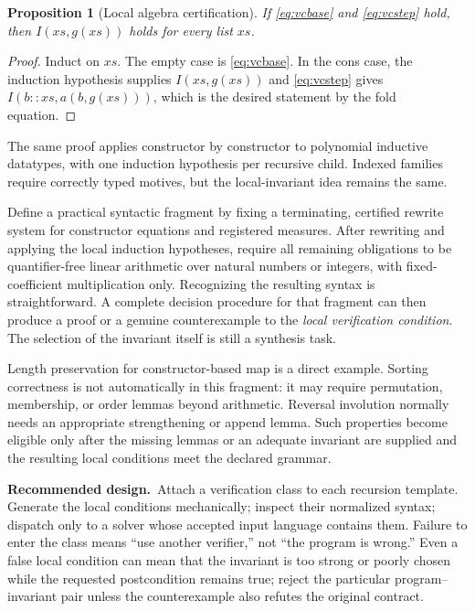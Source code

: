 \documentclass[11pt,a4paper]{article}
\newcommand{\proposal}{\noindent\textbf{Recommended design.}\ }
\newtheorem{proposition}{Proposition}[section]
\theoremstyle{remark}
\begin{document}
\begin{proposition}[Local algebra certification]\label{prop:algebra}
If \eqref{eq:vcbase} and \eqref{eq:vcstep} hold, then $I(xs,g(xs))$ holds for every list $xs$.
\end{proposition}
\begin{proof}
Induct on $xs$. The empty case is \eqref{eq:vcbase}. In the cons case, the induction hypothesis supplies $I(xs,g(xs))$ and \eqref{eq:vcstep} gives $I(b::xs,a(b,g(xs)))$, which is the desired statement by the fold equation.
\end{proof}

The same proof applies constructor by constructor to polynomial inductive datatypes, with one induction hypothesis per recursive child. Indexed families require correctly typed motives, but the local-invariant idea remains the same.

Define a practical syntactic fragment by fixing a terminating, certified rewrite system for constructor equations and registered measures. After rewriting and applying the local induction hypotheses, require all remaining obligations to be quantifier-free linear arithmetic over natural numbers or integers, with fixed-coefficient multiplication only. Recognizing the resulting syntax is straightforward. A complete decision procedure for that fragment can then produce a proof or a genuine counterexample to the \emph{local verification condition}. The selection of the invariant itself is still a synthesis task.

Length preservation for constructor-based map is a direct example. Sorting correctness is not automatically in this fragment: it may require permutation, membership, or order lemmas beyond arithmetic. Reversal involution normally needs an appropriate strengthening or append lemma. Such properties become eligible only after the missing lemmas or an adequate invariant are supplied and the resulting local conditions meet the declared grammar.

\proposal Attach a verification class to each recursion template. Generate the local conditions mechanically; inspect their normalized syntax; dispatch only to a solver whose accepted input language contains them. Failure to enter the class means ``use another verifier,'' not ``the program is wrong.'' Even a false local condition can mean that the invariant is too strong or poorly chosen while the requested postcondition remains true; reject the particular program--invariant pair unless the counterexample also refutes the original contract.
\end{document}
